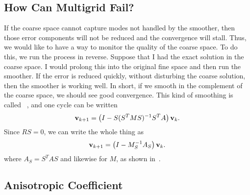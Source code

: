 \begin{refsection}
\chapter{How Can Multigrid Fail?}

If the coarse space cannot capture modes not handled by the smoother, then those error components will not be reduced and the convergence will stall. Thus, we would like to have a way to monitor the quality of the coarse space. To do this, we run the process in reverse. Suppose that I had the exact solution in the coarse space. I would prolong this into the original fine space and then run the smoother. If the error is reduced quickly, without disturbing the coarse solution, then the smoother is working well. In short, if we smooth in the complement of the coarse space, we should see good convergence. This kind of smoothing is called ~\parencite{Brandt2000,BrannickFalgout2007}, and one cycle can be written
\begin{align}
  \vb{v}_{k+1} = \left( I - S (S^T M S)^{-1} S^T A \right) \vb{v}_k.
\end{align}
Since $R S = 0$, we can write the whole thing as
\begin{align}
  \vb{v}_{k+1} = \left( I - M_S^{-1} A_S \right) \vb{v}_k.
\end{align}
where $A_S = S^T A S$ and likewise for $M$, as shown in~\parencite{BrannickEtAl2018}.

\section{Anisotropic Coefficient}


\end{refsection}
